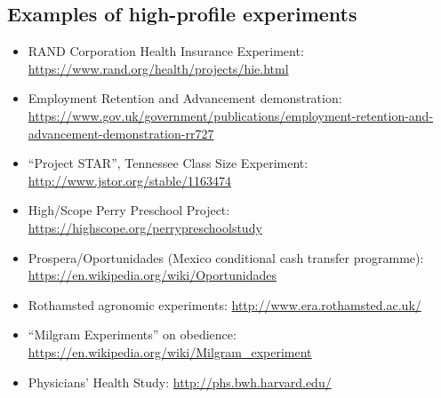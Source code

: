 \documentclass[12pt,a4paper]{article}
\begin{document}
\subsection*{Examples of high-profile experiments}

\begin{itemize}

\item RAND Corporation Health Insurance Experiment: \url{https://www.rand.org/health/projects/hie.html}

\item Employment Retention and Advancement demonstration: \url{https://www.gov.uk/government/publications/employment-retention-and-advancement-demonstration-rr727}

\item ``Project STAR'', Tennessee Class Size Experiment: \url{http://www.jstor.org/stable/1163474}

\item High/Scope Perry Preschool Project: \url{https://highscope.org/perrypreschoolstudy}

\item Prospera/Oportunidades (Mexico conditional cash transfer programme): \url{https://en.wikipedia.org/wiki/Oportunidades}

\item Rothamsted agronomic experiments: \url{http://www.era.rothamsted.ac.uk/}

\item ``Milgram Experiments'' on obedience: \url{https://en.wikipedia.org/wiki/Milgram_experiment}

\item Physicians' Health Study: \url{http://phs.bwh.harvard.edu/}

\end{itemize}





\end{document}
